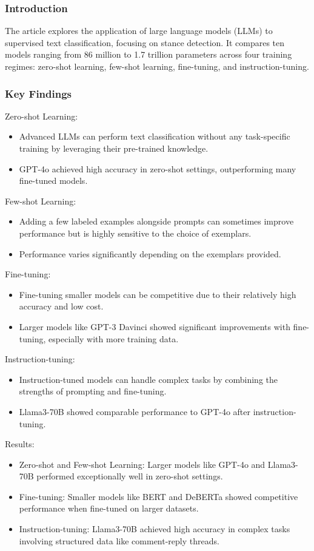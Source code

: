 \documentclass[11pt]{article}
\begin{document}
\subsubsection{Introduction}
The article explores the application of large language models (LLMs) to supervised text classification, focusing on stance detection. It compares ten models ranging from 86 million to 1.7 trillion parameters across four training regimes: zero-shot learning, few-shot learning, fine-tuning, and instruction-tuning.
\subsubsection{Key Findings}
Zero-shot Learning:
\begin{itemize}
    \item Advanced LLMs can perform text classification without any task-specific training by leveraging their pre-trained knowledge.
    \item GPT-4o achieved high accuracy in zero-shot settings, outperforming many fine-tuned models.
\end{itemize}
Few-shot Learning:
\begin{itemize}
    \item Adding a few labeled examples alongside prompts can sometimes improve performance but is highly sensitive to the choice of exemplars.
    \item Performance varies significantly depending on the exemplars provided.
\end{itemize}
Fine-tuning:
\begin{itemize}
    \item Fine-tuning smaller models can be competitive due to their relatively high accuracy and low cost.
    \item Larger models like GPT-3 Davinci showed significant improvements with fine-tuning, especially with more training data.
\end{itemize}
Instruction-tuning:
\begin{itemize}
    \item Instruction-tuned models can handle complex tasks by combining the strengths of prompting and fine-tuning.
    \item Llama3-70B showed comparable performance to GPT-4o after instruction-tuning.
\end{itemize}
Results:
\begin{itemize}
    \item Zero-shot and Few-shot Learning: Larger models like GPT-4o and Llama3-70B performed exceptionally well in zero-shot settings.
    \item Fine-tuning: Smaller models like BERT and DeBERTa showed competitive performance when fine-tuned on larger datasets.
    \item Instruction-tuning: Llama3-70B achieved high accuracy in complex tasks involving structured data like comment-reply threads.
\end{itemize}
\end{document}
